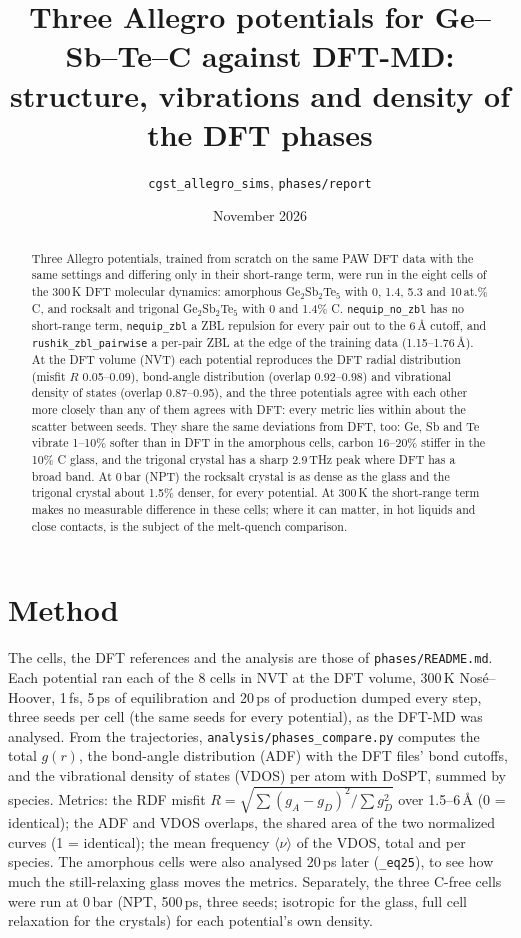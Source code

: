 \documentclass[11pt]{article}
\title{Three Allegro potentials for Ge--Sb--Te--C against DFT-MD:\\ structure, vibrations and density of the DFT phases}
\author{\texttt{cgst\_allegro\_sims}, \texttt{phases/report}}
\date{November 2026}
\newcommand{\GST}{Ge$_2$Sb$_2$Te$_5$}
\newcommand{\noz}{\texttt{nequip\_no\_zbl}}
\newcommand{\zbl}{\texttt{nequip\_zbl}}
\newcommand{\rzp}{\texttt{rushik\_zbl\_pairwise}}
\begin{document}
\maketitle

\begin{abstract}
Three Allegro potentials, trained from scratch on the same PAW DFT data with the same settings and differing only in
their short-range term, were run in the eight cells of the 300\,K DFT molecular dynamics: amorphous \GST{} with 0,
1.4, 5.3 and 10\,at.\% C, and rocksalt and trigonal \GST{} with 0 and 1.4\% C. \noz{} has no short-range term,
\zbl{} a ZBL repulsion for every pair out to the 6\,\AA{} cutoff, and \rzp{} a per-pair ZBL at the edge of the
training data (1.15--1.76\,\AA). At the DFT volume (NVT) each potential reproduces the DFT radial distribution
(misfit $R$ 0.05--0.09), bond-angle distribution (overlap 0.92--0.98) and vibrational density of states (overlap
0.87--0.95), and the three potentials agree with each other more closely than any of them agrees with DFT: every
metric lies within about the scatter between seeds. They share the same deviations from DFT, too: Ge, Sb and Te
vibrate 1--10\% softer than in DFT in the amorphous cells, carbon 16--20\% stiffer in the 10\% C glass, and the
trigonal crystal has a sharp 2.9\,THz peak where DFT has a broad band. At 0\,bar (NPT) the rocksalt crystal is as
dense as the glass and the trigonal crystal about 1.5\% denser, for every potential. At 300\,K the short-range term
makes no measurable difference in these cells; where it can matter, in hot liquids and close contacts, is the subject
of the melt-quench comparison.
\end{abstract}

\section{Method}
The cells, the DFT references and the analysis are those of \texttt{phases/README.md}. Each potential ran each of
the 8 cells in NVT at the DFT volume, 300\,K Nos\'e--Hoover, 1\,fs, 5\,ps of equilibration and 20\,ps of production
dumped every step, three seeds per cell (the same seeds for every potential), as the DFT-MD was analysed. From the
trajectories, \texttt{analysis/phases\_compare.py} computes the total $g(r)$, the bond-angle distribution (ADF) with
the DFT files' bond cutoffs, and the vibrational density of states (VDOS) per atom with DoSPT, summed by species.
Metrics: the RDF misfit $R=\sqrt{\sum (g_A-g_D)^2/\sum g_D^2}$ over 1.5--6\,\AA{} (0 = identical); the ADF and VDOS
overlaps, the shared area of the two normalized curves (1 = identical); the mean frequency $\langle\nu\rangle$ of
the VDOS, total and per species. The amorphous cells were also analysed 20\,ps later (\texttt{\_eq25}), to see how
much the still-relaxing glass moves the metrics. Separately, the three C-free cells were run at 0\,bar (NPT, 500\,ps,
three seeds; isotropic for the glass, full cell relaxation for the crystals) for each potential's own density.
\end{document}
